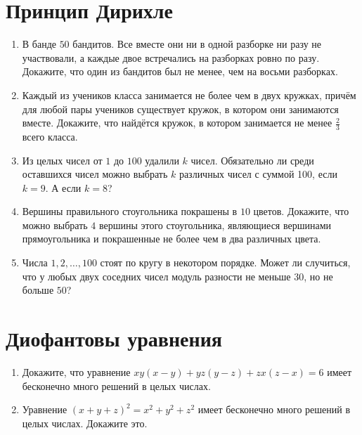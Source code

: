 \documentclass[fleqn,oneside]{book}
\begin{document}
\chapter*{Принцип Дирихле}

\begin{enumerate}
\item В банде $50$ бандитов. Все вместе они ни в одной разборке ни разу не участвовали, а каждые двое встречались на разборках ровно по разу. Докажите, что один из бандитов был не менее, чем на восьми разборках. 

\item Каждый из учеников класса занимается не более чем в двух кружках, причём для любой пары учеников существует кружок, в котором они занимаются вместе. Докажите, что найдётся кружок, в котором занимается не менее $\frac{2}{3}$ всего класса.

\item Из целых чисел от $1$ до $100$ удалили $k$ чисел. Обязательно ли среди оставшихся чисел можно выбрать $k$ различных чисел с суммой 100, если $k = 9$. А если $k = 8$?

\item Вершины правильного стоугольника покрашены в $10$ цветов. Докажите, что можно выбрать $4$ вершины этого стоугольника, являющиеся вершинами прямоугольника и покрашенные не более чем в два различных цвета.

\item Числа $1, 2, \dots, 100$ стоят по кругу в некотором порядке. Может ли случиться, что у любых двух соседних чисел модуль разности не меньше $30$, но не больше $50$?

\end{enumerate}

\chapter*{Диофантовы уравнения}

\begin{enumerate}
\item Докажите, что уравнение $xy(x-y)+yz(y-z)+zx(z-x) = 6 $ имеет бесконечно много решений в целых числах.

\item Уравнение $(x + y + z)^{2} = x^{2} + y^{2} + z^{2}$ имеет бесконечно много решений в целых числах. Докажите это.

\end{enumerate}
\end{document}
